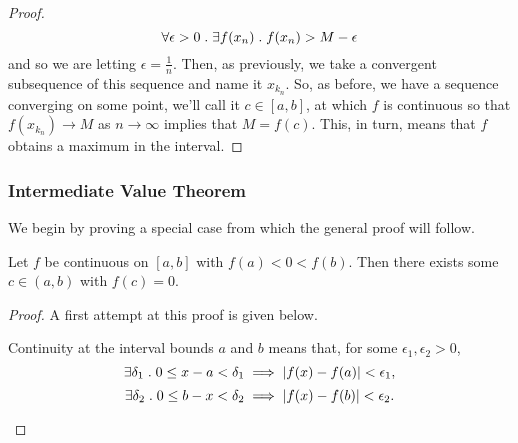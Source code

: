 \documentclass[MathsNotesBase.tex]{subfiles}
\begin{document}
{\begin{proof}
			\[ \forall \epsilon > 0 \;.\; \exists f(x_n) \;.\; f(x_n) > M - \epsilon \]
			and so we are letting ${ \epsilon = \frac{1}{n} }$. Then, as previously, we take a convergent subsequence of this sequence and name it $x_{k_n}$. So, as before, we have a sequence converging on some point, we'll call it ${ c \in [a,b] }$, at which $f$ is continuous so that ${ f(x_{k_n}) \to M }$ as ${ n \to \infty }$ implies that ${ M = f(c) }$. This, in turn, means that $f$ obtains a maximum in the interval.			 
		\end{proof}
	
		\bigskip
		\subsubsection{Intermediate Value Theorem}
		\medskip
		We begin by proving a special case from which the general proof will follow.
		\begin{lemma}
			Let $f$ be continuous on ${ [a,b] }$ with ${ f(a) < 0 < f(b) }$. Then there exists some ${ c \in (a,b) }$ with ${ f(c) = 0 }$.
		\end{lemma}
		\begin{proof}
			A first attempt at this proof is given below.\\
			\begin{displayquote}
				Continuity at the interval bounds $a$ and $b$ means that, for some ${ \epsilon_1, \epsilon_2 > 0 }$,
				\[ \exists \delta_1 \;.\; 0 \leq x - a < \delta_1 \implies \left\lvert f(x) - f(a)\right\rvert < \epsilon_1, \]
				\[ \exists \delta_2 \;.\; 0 \leq b - x < \delta_2 \implies \left\lvert f(x) - f(b)\right\rvert < \epsilon_2. \]
				

\end{displayquote}
\end{proof}}
\end{document}
